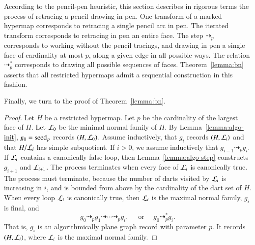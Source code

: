 \begin{remark}
  According to the pencil-pen heuristic, this section describes in
  rigorous terms the process of retracing a pencil drawing in pen.
  One transform of a marked hypermap corresponds to retracing a single pencil
  arc in pen.  The iterated transform corresponds to retracing in pen an
  entire face.  The step $\dashrightarrow_p$ corresponds to working
  without the pencil tracings, and drawing in pen a single face of
  cardinality at most $p$, along a given edge in all possible ways.
  The relation $\dashrightarrow_p^*$ corresponds to drawing all
  possible sequences of faces.  Theorem~\ref{lemma:bn} asserts that
  all restricted hypermaps admit a sequential construction in this
  fashion.
\end{remark}


Finally, we  turn to the proof of Theorem~\ref{lemma:bn}.

\begin{proof}
Let $H$ be a restricted hypermap.  
Let $p$ be the cardinality of the largest face of $H$.
Let ${\cal L}_0$ be the minimal normal family of $H$.
By Lemma~\ref{lemma:algo-init}, $g_0={\operatorname{seed}}_p$ records $(H,{\cal L}_0)$.
Assume inductively, that $g_i$ records $(H,{\cal L}_i)$ and that $H/{\cal L}_i$
has simple subquotient.  If $i>0$, we assume inductively
that $g_{i-1}\dashrightarrow_p g_i$.  If ${\cal L}_i$ contains a canonically false
loop, then  Lemma~\ref{lemma:algo-step} constructs $g_{i+1}$ and ${\cal L}_{i+1}$.
The process terminates when every face of ${\cal L}_i$ is canonically true.
The process must terminate, because the number of darts visited by ${\cal L}_i$
is increasing in $i$, and is 
 bounded from above by the cardinality of the dart set of $H$.
When every loop ${\cal L}_i$ is canonically true, then ${\cal L}_i$ is the maximal
normal family, $g_i$ is final, and
\[
g_0 \dashrightarrow_p g_1 \dashrightarrow\cdots \dashrightarrow_p g_i,
\quad \text{ or }\quad  g_0 \dashrightarrow_p^* g_i.
\]
That is, $g_i$ is an algorithmically plane graph record with parameter $p$.
It records $(H,{\cal L}_i)$, where ${\cal L}_i$ is the maximal normal family.
\end{proof}